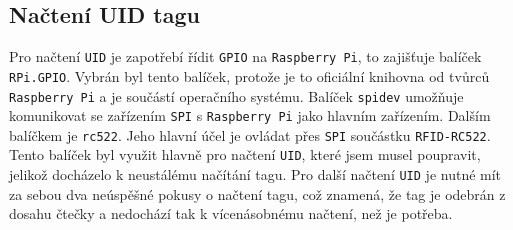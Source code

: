 \documentclass[czech,BP]{thesiskiv}
\begin{document}
	\subsection{Načtení UID tagu}
Pro načtení \texttt{UID} je zapotřebí řídit \texttt{GPIO} na \texttt{Raspberry Pi}, to zajišťuje balíček \texttt{RPi.GPIO}. Vybrán byl tento balíček, protože je to oficiální knihovna od tvůrců \texttt{Raspberry Pi} a je součástí operačního systému.
Balíček \texttt{spidev} umožňuje komunikovat se zařízením \texttt{SPI} s \texttt{Raspberry Pi} jako hlavním zařízením. 
Dalším balíčkem je \texttt{rc522}. Jeho hlavní účel je ovládat přes \texttt{SPI} součástku \texttt{RFID-RC522}. Tento balíček byl využit hlavně pro načtení \texttt{UID}, které jsem musel poupravit, jelikož docházelo k neustálému načítání tagu. 
Pro další načtení \texttt{UID} je nutné mít za sebou dva neúspěšné pokusy o načtení tagu, což znamená, že tag je odebrán z dosahu čtečky a nedochází tak k vícenásobnému načtení, než je potřeba.
\end{document}
